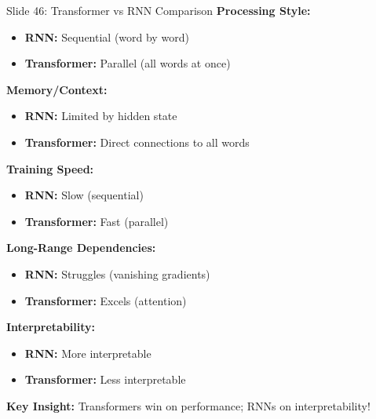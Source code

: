 \documentclass[8pt]{beamer}
\begin{document}
	\begin{frame}{Slide 46: Transformer vs RNN Comparison}
		\fontsize{6.5}{7.5}\selectfont
		\textbf{Processing Style:}
		\begin{itemize}
			\item \textbf{RNN:} Sequential (word by word)
			\item \textbf{Transformer:} Parallel (all words at once)
		\end{itemize}
		
		\vspace{0.1cm}
		\textbf{Memory/Context:}
		\begin{itemize}
			\item \textbf{RNN:} Limited by hidden state
			\item \textbf{Transformer:} Direct connections to all words
		\end{itemize}
		
		\vspace{0.1cm}
		\textbf{Training Speed:}
		\begin{itemize}
			\item \textbf{RNN:} Slow (sequential)
			\item \textbf{Transformer:} Fast (parallel)
		\end{itemize}
		
		\vspace{0.1cm}
		\textbf{Long-Range Dependencies:}
		\begin{itemize}
			\item \textbf{RNN:} Struggles (vanishing gradients)
			\item \textbf{Transformer:} Excels (attention)
		\end{itemize}
		
		\vspace{0.1cm}
		\textbf{Interpretability:}
		\begin{itemize}
			\item \textbf{RNN:} More interpretable
			\item \textbf{Transformer:} Less interpretable
		\end{itemize}
		
		\textcolor{myblue}{\textbf{Key Insight:}} Transformers win on performance; RNNs on interpretability!
	\end{frame}
	
\end{document}
